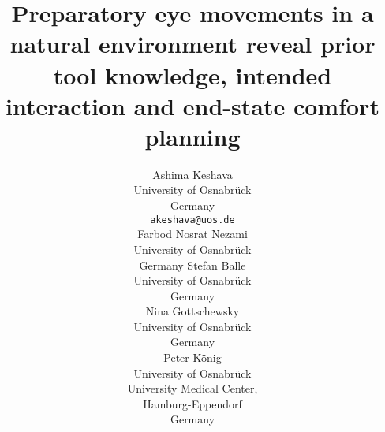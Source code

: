 \documentclass{article}
\begin{document}
\title{Preparatory eye movements in a natural environment reveal prior tool knowledge, intended interaction and end-state comfort planning}

\author{
  Ashima Keshava\\
  University of Osnabr{\"u}ck\\
  Germany\\
  \texttt{akeshava@uos.de} \\
   \And
   Farbod Nosrat Nezami\\
  University of Osnabr{\"u}ck\\
  Germany
   \And
   Stefan Balle\\
  University of Osnabr{\"u}ck\\
  Germany\\
  
   \And
   Nina Gottschewsky\\
  University of Osnabr{\"u}ck\\
  Germany\\
  \And
   Peter K{\"o}nig\\
   University of Osnabr{\"u}ck\\
   University Medical Center,\\ Hamburg-Eppendorf\\
   Germany
}

\maketitle

\begin{abstract}

\end{abstract}


\linenumbers
\captionsetup[figure]{font=scriptsize,labelfont=bf}




% 

% 
\end{document}
